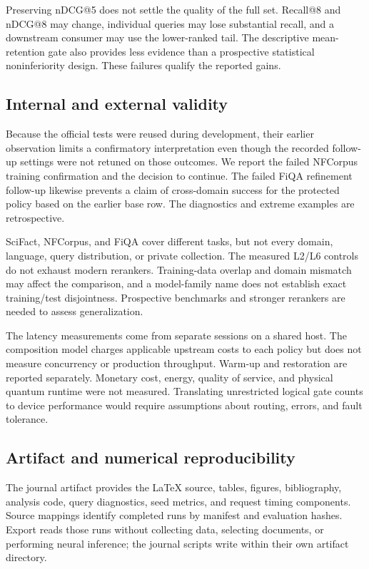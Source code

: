 Preserving nDCG@5 does not settle the quality of the full set. Recall@8 and nDCG@8 may change, individual queries may lose substantial recall, and a downstream consumer may use the lower-ranked tail. The descriptive mean-retention gate also provides less evidence than a prospective statistical noninferiority design. These failures qualify the reported gains.

\subsection{Internal and external validity}
Because the official tests were reused during development, their earlier observation limits a confirmatory interpretation even though the recorded follow-up settings were not retuned on those outcomes. We report the failed NFCorpus training confirmation and the decision to continue. The failed FiQA refinement follow-up likewise prevents a claim of cross-domain success for the protected policy based on the earlier base row. The diagnostics and extreme examples are retrospective.

SciFact, NFCorpus, and FiQA cover different tasks, but not every domain, language, query distribution, or private collection. The measured L2/L6 controls do not exhaust modern rerankers. Training-data overlap and domain mismatch may affect the comparison, and a model-family name does not establish exact training/test disjointness. Prospective benchmarks and stronger rerankers are needed to assess generalization.

The latency measurements come from separate sessions on a shared host. The composition model charges applicable upstream costs to each policy but does not measure concurrency or production throughput. Warm-up and restoration are reported separately. Monetary cost, energy, quality of service, and physical quantum runtime were not measured. Translating unrestricted logical gate counts to device performance would require assumptions about routing, errors, and fault tolerance.

\subsection{Artifact and numerical reproducibility}
The journal artifact provides the LaTeX source, tables, figures, bibliography, analysis code, query diagnostics, seed metrics, and request timing components. Source mappings identify completed runs by manifest and evaluation hashes. Export reads those runs without collecting data, selecting documents, or performing neural inference; the journal scripts write within their own artifact directory.

